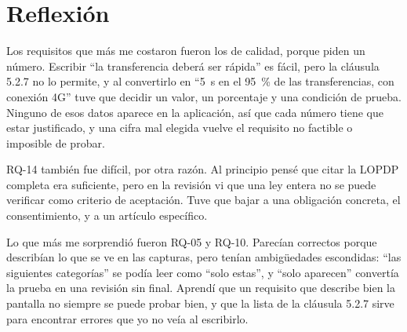 \documentclass[11pt,a4paper]{article}
\begin{document}
\section{Reflexión}
Los requisitos que más me costaron fueron los de calidad, porque piden un número. Escribir “la transferencia deberá ser rápida” es fácil, pero la cláusula 5.2.7 no lo permite, y al convertirlo en “5~s en el 95~\% de las transferencias, con conexión 4G” tuve que decidir un valor, un porcentaje y una condición de prueba. Ninguno de esos datos aparece en la aplicación, así que cada número tiene que estar justificado, y una cifra mal elegida vuelve el requisito no factible o imposible de probar.

RQ-14 también fue difícil, por otra razón. Al principio pensé que citar la LOPDP completa era suficiente, pero en la revisión vi que una ley entera no se puede verificar como criterio de aceptación. Tuve que bajar a una obligación concreta, el consentimiento, y a un artículo específico.

Lo que más me sorprendió fueron RQ-05 y RQ-10. Parecían correctos porque describían lo que se ve en las capturas, pero tenían ambigüedades escondidas: “las siguientes categorías” se podía leer como “solo estas”, y “solo aparecen” convertía la prueba en una revisión sin final. Aprendí que un requisito que describe bien la pantalla no siempre se puede probar bien, y que la lista de la cláusula 5.2.7 sirve para encontrar errores que yo no veía al escribirlo.

\end{document}
